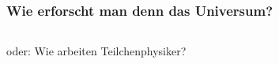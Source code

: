 \documentclass{beamer}
\begin{document}
\begin{frame}
  \frametitle{Wie erforscht man denn das Universum?}
  \vskip-0.6cm
  \begin{columns}[T]
    \begin{column}{0.55\textwidth}
      \begin{flushleft}
        oder: Wie arbeiten Teilchenphysiker?
      \end{flushleft}
      \begin{center}
      \end{center}
    \end{column}

\end{columns}
\end{frame}
\end{document}
